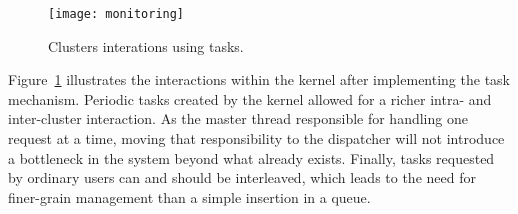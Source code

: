 	\begin{figure}[tb]
			\centering
			\texttt{[image: monitoring]}
			\caption{Clusters interations using tasks.}
			\label{fig:monitor}
	\end{figure}

	Figure~\ref{fig:monitor} illustrates the interactions within the kernel
	after implementing the task mechanism. Periodic tasks created by the kernel
	allowed for a richer intra- and inter-cluster interaction. As the master
	thread responsible for handling one request at a time, moving that
	responsibility to the dispatcher will not introduce a bottleneck in the
	system beyond what already exists. Finally, tasks requested by ordinary
	users can and should be interleaved, which leads to the need for
	finer-grain management than a simple insertion in a queue.	

